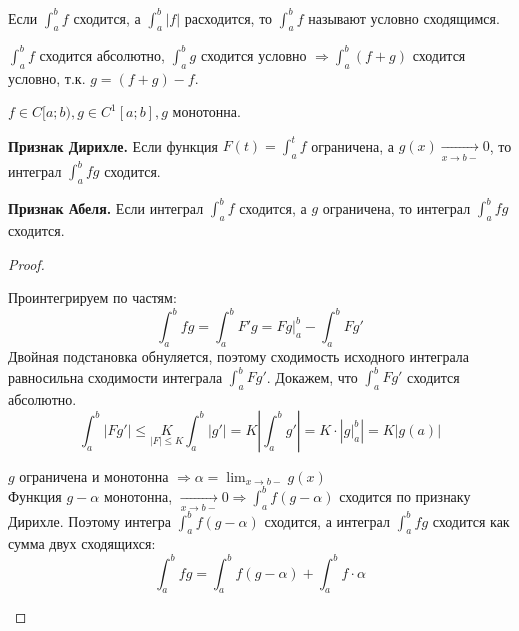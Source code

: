\begin{Def} 
	Если $\displaystyle \int_{a}^{b} f$ сходится, а $\displaystyle \int_{a}^{b} |f|$ расходится, то 
	$\displaystyle \int_{a}^{b} f$ называют условно сходящимся.
\end{Def} 

\begin{Rem}
	$\displaystyle \int_{a}^{b} f$ сходится абсолютно, $\displaystyle \int_{a}^{b} g$ сходится условно $\displaystyle \Rightarrow \int_{a}^{b} 
	(f+g)$ сходится условно, т.к. $g = (f+g)-f$.
\end{Rem}

\begin{Thm}
	$f \in C[a;b), g \in C^1[a;b], g$ монотонна.

	\begin{MyList}
		\item \textbf{Признак Дирихле.}
		Если функция $F(t) = \int_a^t f$ ограничена, а $g(x) \xrightarrow[x \to b-]{} 0$, то интеграл $\int_a^b fg$ сходится.

		\item \textbf{Признак Абеля.}
		Если интеграл $\int_a^b f$ сходится, а $g$ ограничена, то интеграл $\int_a^b fg$ сходится.
	\end{MyList}
\end{Thm} 

\begin{proof}
	\begin{MyList}
	\item Проинтегрируем по частям:
	$$\displaystyle \int_{a}^{b} fg = \int_{a}^{b} F'g = Fg \Big|_a^b - \int_{a}^{b} Fg'$$
	Двойная подстановка обнуляется, поэтому сходимость исходного интеграла равносильна сходимости интеграла $\int_a^b Fg'$. Докажем, что $\int_{a}^{b} Fg'$ сходится абсолютно. 
	\[ \int_{a}^{b} |Fg'| \leqslant \underset{|F| \leqslant K}{K}  \int_{a}^{b} |g'| = K \left|\int_{a}^{b} g'\right| = 
	K \cdot |g \Big|^b_a| = K|g(a)|\]

	\item $g$ ограничена и монотонна $\Rightarrow \alpha = \lim_{x \to b-} g(x)$\\
	Функция $g - \alpha$ монотонна, $\xrightarrow[x \to b-]{} 0 \Rightarrow 
	\int_{a}^{b} f(g - \alpha)$ сходится по признаку Дирихле. Поэтому интегра $\int_a^b f(g - \alpha)$ сходится, а интеграл $\int_a^b fg$ сходится как сумма двух сходящихся: 
	$$\displaystyle \int_{a}^{b} fg = \int_{a}^{b} f(g-\alpha) + \int_{a}^{b} f \cdot \alpha$$
	\end{MyList}
\end{proof}

